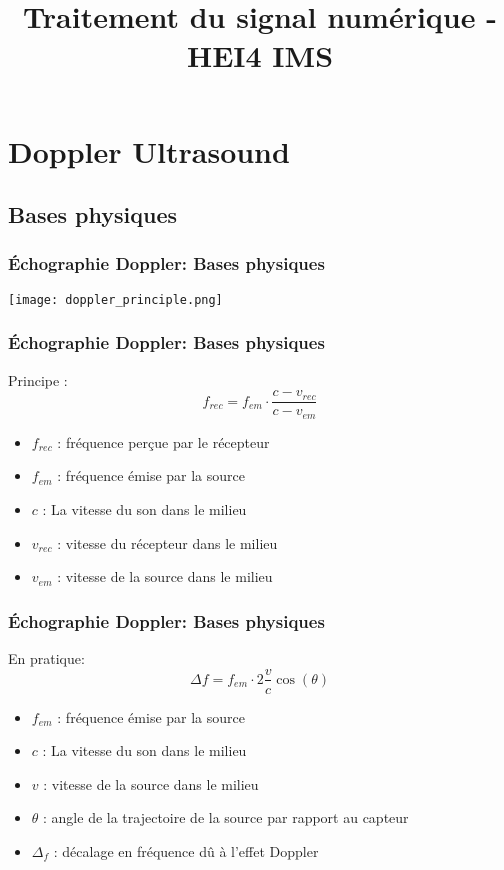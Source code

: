 \documentclass{beamer}
\title[Traitement du signal numérique]{Traitement du signal numérique - HEI4 IMS}
\author[Antony Bazir]{}
\begin{document}
\section{Doppler Ultrasound}
\subsection{Bases physiques}
\begin{frame}
\frametitle{\'Echographie Doppler:  Bases physiques}
\center
\texttt{[image: doppler\_principle.png]}
\end{frame}

\begin{frame}
\frametitle{\'Echographie Doppler:  Bases physiques}
Principe : \\
\vspace{0.5cm}
\[ f_{rec} = f_{em} \cdot \frac{c - v_{rec}}{c - v_{em}} \]
\vspace{0.5cm}
\begin{itemize}
\item $f_{rec}$ : fréquence perçue par le récepteur
\vspace{0.2cm}
\item $f_{em}$ : fréquence émise par la source\\
\vspace{0.2cm}
\item $c$ : La vitesse du son dans le milieu
\vspace{0.2cm}
\item $v_{rec}$ : vitesse du récepteur dans le milieu
\vspace{0.2cm}
\item $v_{em}$ : vitesse de la source dans le milieu

\end{itemize} 
\end{frame}

\begin{frame}
\frametitle{\'Echographie Doppler:  Bases physiques}
En pratique:
\\
\vspace{0.5cm} 
\[ \Delta f = f_{em} \cdot 2 \frac{v}{c} \cos(\theta) \]
\vspace{0.5cm}
\begin{itemize}
\item $f_{em}$ : fréquence émise par la source\\
\vspace{0.2cm}
\item $c$ : La vitesse du son dans le milieu
\vspace{0.2cm}
\item $v$ : vitesse de la source dans le milieu
\vspace{0.2cm}
\item $\theta$ : angle de la trajectoire de la source par rapport au capteur
\vspace{0.2cm}
\item $\Delta_f$ : décalage en fréquence dû à l'effet Doppler
\end{itemize} 
\end{frame}
\end{document}
